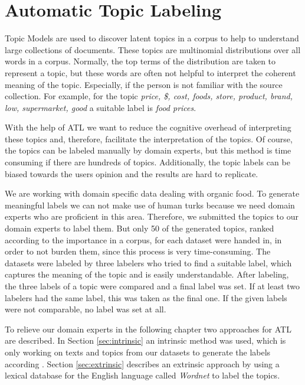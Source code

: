 
\section{Automatic Topic Labeling}
\label{automaticTL}
Topic Models are used to discover latent topics in a corpus to help to understand large collections of documents. These topics are multinomial distributions over all words in a corpus. Normally, the top terms of the distribution are taken to represent a topic, but these words are often not helpful to interpret the coherent meaning of the topic. Especially, if the person is not familiar with the source collection. For example, for the topic \textit{price, \$, cost, foods, store, product, brand, low, supermarket, good} a  suitable label is \textit{food prices}.

With the help of \acf{ATL} we want to reduce the cognitive overhead of interpreting these topics and, therefore, facilitate the interpretation of the topics.
Of course, the topics can be labeled manually by domain experts, but this method is time consuming if there are hundreds of topics. Additionally, the topic labels can be biased towards the users opinion and the results are hard to replicate. 

We are working with domain specific data dealing with organic food. To generate meaningful labels we can not make use of human turks because we need domain experts who are proficient in this area. Therefore, we submitted the topics to our domain experts to label them. But only 50 of the generated topics, ranked according to the importance in a corpus, for each dataset were handed in, in order to not burden them, since this process is very time-consuming. The datasets were labeled by three labelers who tried to find a suitable label, which captures the meaning of the topic and is easily understandable. After labeling, the three labels of a topic were compared and a final label was set. If at least two labelers had the same label, this was taken as the final one. If the given labels were not comparable, no label was set at all. 

To relieve our domain experts in the following chapter two approaches for \ac{ATL} are described. In Section \ref{sec:intrinsic} an intrinsic method was used, which is only working on texts and topics from our datasets to generate the labels according \cite{Mei2007}. Section \ref{sec:extrinsic} describes an extrinsic approach by using a lexical database for the English language called \textit{Wordnet} to label the topics.

